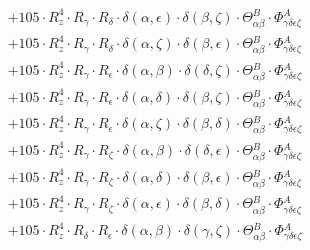 \documentclass{article}
\begin{document}
\begin{equation}
\begin{array}{c}
 \\[0.2em] 		 + 105 \cdot R_{z}^{4} \cdot R_{\gamma{}} \cdot R_{\delta{}} \cdot \delta{}\left(\alpha{}, \epsilon{}\right) \cdot \delta{}\left(\beta{}, \zeta{}\right) \cdot \Theta{}^{B}_{\alpha{}\beta{}} \cdot \Phi{}^{A}_{\gamma{}\delta{}\epsilon{}\zeta{}} 
 \\[0.2em] 		 + 105 \cdot R_{z}^{4} \cdot R_{\gamma{}} \cdot R_{\delta{}} \cdot \delta{}\left(\alpha{}, \zeta{}\right) \cdot \delta{}\left(\beta{}, \epsilon{}\right) \cdot \Theta{}^{B}_{\alpha{}\beta{}} \cdot \Phi{}^{A}_{\gamma{}\delta{}\epsilon{}\zeta{}} 
 \\[0.2em] 		 + 105 \cdot R_{z}^{4} \cdot R_{\gamma{}} \cdot R_{\epsilon{}} \cdot \delta{}\left(\alpha{}, \beta{}\right) \cdot \delta{}\left(\delta{}, \zeta{}\right) \cdot \Theta{}^{B}_{\alpha{}\beta{}} \cdot \Phi{}^{A}_{\gamma{}\delta{}\epsilon{}\zeta{}} 
 \\[0.2em] 		 + 105 \cdot R_{z}^{4} \cdot R_{\gamma{}} \cdot R_{\epsilon{}} \cdot \delta{}\left(\alpha{}, \delta{}\right) \cdot \delta{}\left(\beta{}, \zeta{}\right) \cdot \Theta{}^{B}_{\alpha{}\beta{}} \cdot \Phi{}^{A}_{\gamma{}\delta{}\epsilon{}\zeta{}} 
 \\[0.2em] 		 + 105 \cdot R_{z}^{4} \cdot R_{\gamma{}} \cdot R_{\epsilon{}} \cdot \delta{}\left(\alpha{}, \zeta{}\right) \cdot \delta{}\left(\beta{}, \delta{}\right) \cdot \Theta{}^{B}_{\alpha{}\beta{}} \cdot \Phi{}^{A}_{\gamma{}\delta{}\epsilon{}\zeta{}} 
 \\[0.2em] 		 + 105 \cdot R_{z}^{4} \cdot R_{\gamma{}} \cdot R_{\zeta{}} \cdot \delta{}\left(\alpha{}, \beta{}\right) \cdot \delta{}\left(\delta{}, \epsilon{}\right) \cdot \Theta{}^{B}_{\alpha{}\beta{}} \cdot \Phi{}^{A}_{\gamma{}\delta{}\epsilon{}\zeta{}} 
 \\[0.2em] 		 + 105 \cdot R_{z}^{4} \cdot R_{\gamma{}} \cdot R_{\zeta{}} \cdot \delta{}\left(\alpha{}, \delta{}\right) \cdot \delta{}\left(\beta{}, \epsilon{}\right) \cdot \Theta{}^{B}_{\alpha{}\beta{}} \cdot \Phi{}^{A}_{\gamma{}\delta{}\epsilon{}\zeta{}} 
 \\[0.2em] 		 + 105 \cdot R_{z}^{4} \cdot R_{\gamma{}} \cdot R_{\zeta{}} \cdot \delta{}\left(\alpha{}, \epsilon{}\right) \cdot \delta{}\left(\beta{}, \delta{}\right) \cdot \Theta{}^{B}_{\alpha{}\beta{}} \cdot \Phi{}^{A}_{\gamma{}\delta{}\epsilon{}\zeta{}} 
 \\[0.2em] 		 + 105 \cdot R_{z}^{4} \cdot R_{\delta{}} \cdot R_{\epsilon{}} \cdot \delta{}\left(\alpha{}, \beta{}\right) \cdot \delta{}\left(\gamma{}, \zeta{}\right) \cdot \Theta{}^{B}_{\alpha{}\beta{}} \cdot \Phi{}^{A}_{\gamma{}\delta{}\epsilon{}\zeta{}} 

\end{array}
\end{equation}
\end{document}
